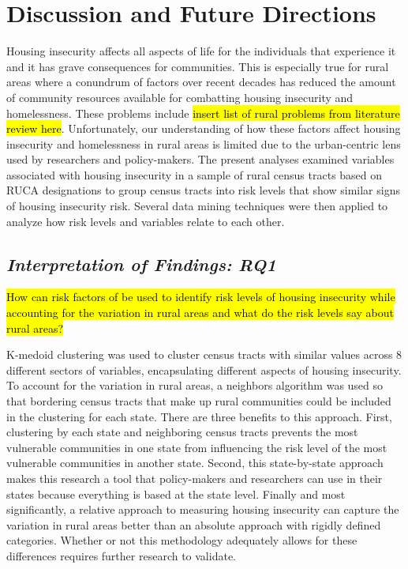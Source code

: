 \chapter{Discussion and Future Directions}	



Housing insecurity affects all aspects of life for the individuals that experience it and it has grave consequences for communities. This is especially true for rural areas where a conundrum of factors over recent decades has reduced the amount of community resources available for combatting housing insecurity and homelessness. These problems include \hl{insert list of rural problems from literature review here}. Unfortunately, our understanding of how these factors affect housing insecurity and homelessness in rural areas is limited due to the urban-centric lens used by researchers and policy-makers. The present analyses examined variables associated with housing insecurity in a sample of rural census tracts based on RUCA designations to group census tracts into risk levels that show similar signs of housing insecurity risk. Several data mining techniques were then applied to analyze how risk levels and variables relate to each other.

\section{\textit{Interpretation of Findings: RQ1}}

\hl{How can risk factors of be used to identify risk levels of housing insecurity while accounting for the variation in rural areas and what do the risk levels say about rural areas?}

K-medoid clustering was used to cluster census tracts with similar values across 8 different sectors of variables, encapsulating different aspects of housing insecurity. To account for the variation in rural areas, a neighbors algorithm was used so that bordering census tracts that make up rural communities could be included in the clustering for each state. There are three benefits to this approach. First, clustering by each state and neighboring census tracts prevents the most vulnerable communities in one state from influencing the risk level of the most vulnerable communities in another state. Second, this state-by-state approach makes this research a tool that policy-makers and researchers can use in their states because everything is based at the state level. Finally and most significantly, a relative approach to measuring housing insecurity can capture the variation in rural areas better than an absolute approach with rigidly defined categories. Whether or not this methodology adequately allows for these differences requires further research to validate. 

